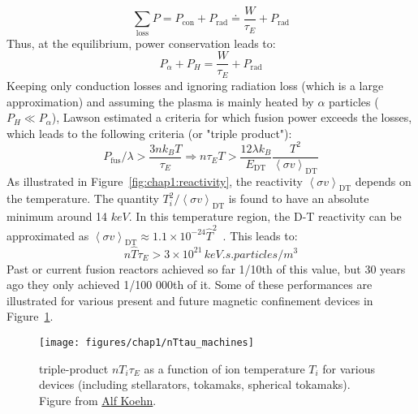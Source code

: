 \begin{equation}
\sum_{\mathrm{loss}} P 
	=
	P_{\mathrm{con}} + P_{\mathrm{rad}}
	\doteq 
	\frac{ W }{ \tau_E } + P_{\mathrm{rad}}
	\label{eq:losses}
\end{equation}
Thus, at the equilibrium, power conservation leads to:
\begin{equation}
P_\alpha + P_{H} = \frac{ W }{ \tau_E } + P_{\mathrm{rad}}
\end{equation}
Keeping only conduction losses and ignoring radiation loss (which is a large approximation) and assuming the plasma is mainly heated by $\alpha$ particles ($P_H\ll P_\alpha$), Lawson estimated a criteria for which fusion power exceeds the losses, which leads to the following criteria (or "triple product"):
\begin{equation*}
	P_{\mathrm{fus}}/\lambda > \frac{3n k_B T}{\tau_E}
	\Rightarrow
	n \tau_E T > 
		\frac{12 \lambda k_B}{E_{\mathrm{DT}}} 
		\frac{T^2}{\left<\sigma v \right>_{\mathrm{DT}}}
\end{equation*}
As illustrated in Figure~\ref{fig:chap1:reactivity}, the reactivity $\left<\sigma v \right>_{\mathrm{DT}}$ depends on the temperature. The quantity $T_i^2 / \left<\sigma v \right>_{\mathrm{DT}}$ is found to have an absolute minimum around 14 $\si{keV}$. In this temperature region, the D-T reactivity can be approximated as $\left<\sigma v \right>_{\mathrm{DT}}\approx 1.1\times10^{-24} \hat{T}^2$~. 
This leads to:
\begin{equation}	
	n \hat{T} \tau_E > 3\times 10^{21} \, \si{keV.s.particles/m^3}
	\label{eq:lawson_criteria}
\end{equation}
Past or current fusion reactors achieved so far 1/10th of this value, but 30 years ago they only achieved 1/100 000th of it. Some of these performances are illustrated for various present and future magnetic confinement devices in Figure~\ref{fig:chap1:nTtau_machines}.

\begin{figure}
	\centering
	\texttt{[image: figures/chap1/nTtau\_machines]}
	\caption{triple-product $n T_i \tau_E$ as a function of ion temperature $T_i$ for various devices (including stellarators, tokamaks, spherical tokamaks). Figure from \href{https://github.com/alfkoehn/fusion_plots/releases/tag/v1.0.0}{Alf Koehn}.}
	\label{fig:chap1:nTtau_machines}
\end{figure}


